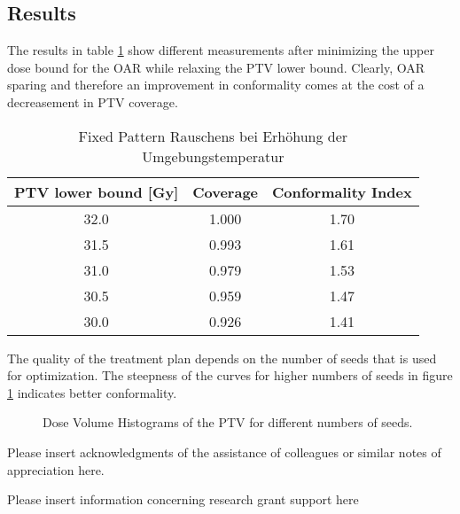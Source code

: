 \documentclass[USenglish,twocolumn]{article}
\begin{document}
	\subsection{Results}
		The results in table \ref{table:LPSW_results} show different measurements after minimizing the upper dose bound for the OAR while relaxing the PTV lower bound. Clearly, OAR sparing and therefore an improvement in conformality comes at the cost of a decreasement in PTV coverage.
		\begin{table}[ht]
			\centering		
		 	\caption{Fixed Pattern Rauschens bei Erhöhung der Umgebungstemperatur}
		 	\label{table:LPSW_results}
			\begin{tabular}{ccc}
				PTV lower bound [Gy] 	& Coverage 	& Conformality Index\\	\hline
				32.0 					& 1.000		& 1.70\\
				31.5 					& 0.993 	& 1.61\\
				31.0 					& 0.979 	& 1.53\\
				30.5 					& 0.959 	& 1.47\\
				30.0 					& 0.926		& 1.41\\		
			\end{tabular}
		\end{table}	
		
		The quality of the treatment plan depends on the number of seeds that is used for optimization.
		The steepness of the curves for higher numbers of seeds in figure \ref{fig:LPSW_DVH_numberOfSeeds} indicates better conformality.
		\begin{figure}[ht]
			\centering
			 
			\caption{Dose Volume Histograms of the PTV for different numbers of seeds.}
			\label{fig:LPSW_DVH_numberOfSeeds}
		\end{figure}


\begin{acknowledgement}
Please insert acknowledgments of the assistance of colleagues or similar notes of appreciation here.
\end{acknowledgement}

\def\acknowledgementname{Funding}
\begin{acknowledgement}
Please insert information concerning research grant support here
\end{acknowledgement}

%
%
\end{document}
